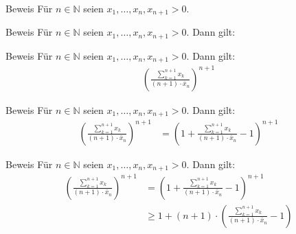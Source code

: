 \documentclass[10pt]{beamer}
\def\bN{\mathbb{N}}
\begin{document}
\begin{frame}{Beweis}
    Für \( n \in \bN \) seien \( x_{1}, \ldots, x_{n}, x_{n + 1} > 0 \).
\end{frame}



\begin{frame}{Beweis}
    Für \( n \in \bN \) seien \( x_{1}, \ldots, x_{n}, x_{n + 1} > 0 \). Dann gilt:
\end{frame}



\begin{frame}{Beweis}
    Für \( n \in \bN \) seien \( x_{1}, \ldots, x_{n}, x_{n + 1} > 0 \). Dann gilt:
    \begin{align*}
        \left( \frac{\sum_{k = 1}^{n + 1} x_{k}}{\left( n + 1 \right) \cdot \bar{x}_{n}} \right)^{n + 1}
    \end{align*}
\end{frame}



\begin{frame}{Beweis}
    Für \( n \in \bN \) seien \( x_{1}, \ldots, x_{n}, x_{n + 1} > 0 \). Dann gilt:
    \begin{align*}
        \left( \frac{\sum_{k = 1}^{n + 1} x_{k}}{\left( n + 1 \right) \cdot \bar{x}_{n}} \right)^{n + 1}
        & = \left( 1 + \frac{\sum_{k = 1}^{n + 1} x_{k}}{\left( n + 1 \right) \cdot \bar{x}_{n}} - 1 \right)^{n + 1}
    \end{align*}
\end{frame}



\begin{frame}{Beweis}
    Für \( n \in \bN \) seien \( x_{1}, \ldots, x_{n}, x_{n + 1} > 0 \). Dann gilt:
    \begin{align*}
        \left( \frac{\sum_{k = 1}^{n + 1} x_{k}}{\left( n + 1 \right) \cdot \bar{x}_{n}} \right)^{n + 1}
        & = \left( 1 + \frac{\sum_{k = 1}^{n + 1} x_{k}}{\left( n + 1 \right) \cdot \bar{x}_{n}} - 1 \right)^{n + 1} \\
        & \geq 1 + \left( n + 1 \right) \cdot \left( \frac{\sum_{k = 1}^{n + 1} x_{k}}{\left( n + 1 \right) \cdot \bar{x}_{n}} - 1 \right)
    \end{align*}
\end{frame}
\end{document}
